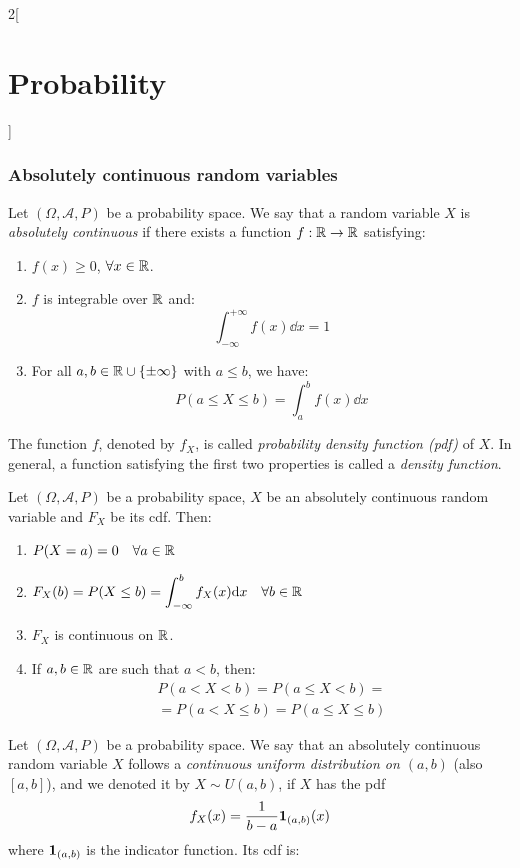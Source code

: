 \documentclass[../../../main.tex]{subfiles}
\begin{document}
\begin{multicols}{2}[\section{Probability}]
  \subsubsection{Absolutely continuous random variables}
  \begin{definition}
    Let $(\Omega,\mathcal{A},P)$ be a probability space. We say that a random variable $X$ is \textit{absolutely continuous} if there exists a function $f:\mathbb{R}\rightarrow\mathbb{R}$ satisfying:
    \begin{enumerate}
      \item $f(x)\geq 0$, $\forall x\in\mathbb{R}$.
      \item $f$ is integrable over $\mathbb{R}$ and: $$\int_{-\infty}^{+\infty}f(x)\dd x=1$$
      \item For all $a,b\in\mathbb{R}\cup\{\pm\infty\}$ with $a\leq b$, we have: $$P(a\leq X\leq b)=\int_a^bf(x)\dd x$$
    \end{enumerate}
    The function $f$, denoted by $f_X$, is called \textit{probability density function (pdf)} of $X$. In general, a function satisfying the first two properties is called a \textit{density function}.
  \end{definition}
  \begin{prop}
    Let $(\Omega,\mathcal{A},P)$ be a probability space, $X$ be an absolutely continuous random variable and $F_X$ be its cdf. Then:
    \begin{enumerate}
      \item $P(X=a)=0\quad\forall a\in \mathbb{R}$
      \item $\displaystyle F_X(b)=P(X\leq b)=\int_{-\infty}^bf_X(x)\dd x\quad\forall b\in\mathbb{R}$
      \item $F_X$ is continuous on $\mathbb{R}$.
      \item If $a,b\in\mathbb{R}$ are such that $a<b$, then:
            \begin{multline*}
              P(a<X<b)=P(a\leq X<b)=\\=P(a<X\leq b)=P(a\leq X\leq b)
            \end{multline*}
    \end{enumerate}
  \end{prop}
  \begin{definition}
    Let $(\Omega,\mathcal{A},P)$ be a probability space. We say that an absolutely continuous random variable $X$ follows a \textit{continuous uniform distribution on $(a,b)$} (also $[a,b]$), and we denoted it by $X\sim U(a,b)$, if $X$ has the pdf $$f_X(x)=\frac{1}{b-a}\boldsymbol{\mathrm{1}}_{(a,b)}(x)$$ where $\boldsymbol{\mathrm{1}}_{(a,b)}$ is the indicator function. Its cdf is:

\end{definition}
\end{multicols}
\end{document}

